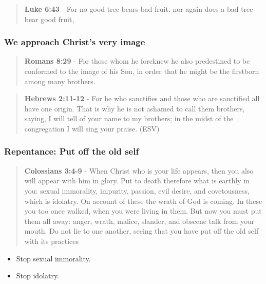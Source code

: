 \documentclass[11pt]{article}
\begin{document}
\begin{quote}
\textbf{Luke 6:43} - For no good tree bears bad fruit, nor again does a bad tree bear good fruit,
\end{quote}

\subsubsection{We approach Christ's very image}
\label{sec:org051e7a8}
\begin{quote}
\textbf{Romans 8:29} - For those whom he foreknew he also predestined to be conformed to the image of his Son, in order that he might be the firstborn among many brothers.
\end{quote}

\begin{quote}
\textbf{Hebrews 2:11-12} -  For he who sanctifies and those who are sanctified all have one origin.  That is why he is not ashamed to call them brothers, saying, I will tell of your name to my brothers; in the midst of the congregation I will sing your praise.  (ESV)
\end{quote}

\subsubsection{Repentance: Put off the old self}
\label{sec:orgaf395de}
\begin{quote}
\textbf{Colossians 3:4-9} - When Christ who is your life appears, then you also will appear with him in glory. Put to death therefore what is earthly in you: sexual immorality, impurity, passion, evil desire, and covetousness, which is idolatry. On account of these the wrath of God is coming. In these you too once walked, when you were living in them. But now you must put them all away: anger, wrath, malice, slander, and obscene talk from your mouth. Do not lie to one another, seeing that you have put off the old self with its practices
\end{quote}

\begin{itemize}
\item Stop sexual immorality.
\item Stop idolatry.
\end{itemize}
\end{document}

